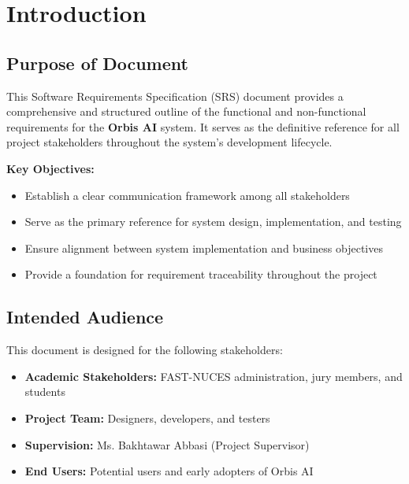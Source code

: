 \documentclass[12pt,a4paper]{article}
\begin{document}
\newpage

\tableofcontents
\newpage


\section{Introduction}

\subsection{Purpose of Document}

This Software Requirements Specification (SRS) document provides a comprehensive and structured outline of the functional and non-functional requirements for the \textbf{Orbis AI} system. It serves as the definitive reference for all project stakeholders throughout the system's development lifecycle.

\begin{highlightbox}
\textbf{Key Objectives:}
\begin{itemize}[leftmargin=*, itemsep=0.3em]
    \item Establish a clear communication framework among all stakeholders
    \item Serve as the primary reference for system design, implementation, and testing
    \item Ensure alignment between system implementation and business objectives
    \item Provide a foundation for requirement traceability throughout the project
\end{itemize}
\end{highlightbox}

\subsection{Intended Audience}

This document is designed for the following stakeholders:

\begin{itemize}[leftmargin=*, itemsep=0.3em]
    \item \textbf{Academic Stakeholders:} FAST-NUCES administration, jury members, and students
    \item \textbf{Project Team:} Designers, developers, and testers
    \item \textbf{Supervision:} Ms. Bakhtawar Abbasi (Project Supervisor)
    \item \textbf{End Users:} Potential users and early adopters of Orbis AI
\end{itemize}
\end{document}
